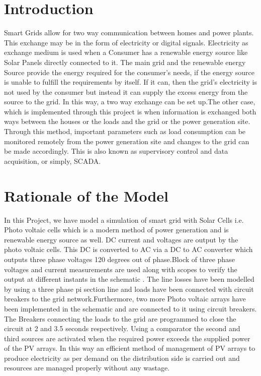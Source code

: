 \documentclass[12pt]{report}
\begin{document}
\section*{Introduction}

Smart Grids allow for two way communication between homes and power plants. This exchange may be in the form of electricity or digital signals. Electricity as exchange medium is used when a Consumer has a renewable energy source like Solar Panels directly connected to it. The main grid and the renewable energy Source provide the energy required for the consumer's needs, if the energy source is unable to fulfill the requirements by itself. If it can, then the grid's electricity is not used by the consumer but instead it can supply the excess energy from the source to the grid. In this way, a two way exchange can be set up.The other case, which is implemented through this project is when information is exchanged both ways between the houses or the loads and the grid or the power generation site. Through this method, important parameters such as load consumption can be monitored remotely from the power generation site and changes to the grid can be made accordingly. This is also known as supervisory control and data acquisition, or simply, SCADA. 

\section*{Rationale of the Model}
In this Project, we have model a simulation of smart grid with Solar Cells i.e. Photo voltaic cells which is a modern method of power generation and is renewable energy source as well. DC current and voltages are output by the photo voltaic cells. This DC is converted to AC via a DC to AC converter which outputs three phase voltages 120 degrees out of phase.Block of three phase voltages and current measurements are used along with scopes to verify the output at different instants in the schematic . The line losses have been modelled by using a three phase pi section line and loads have been connected with circuit breakers to the grid network.Furthermore, two more Photo voltaic arrays have been implemented in the schematic and are connected to it using circuit breakers. The Breakers connecting the loads to the grid are programmed to close the circuit at 2 and 3.5 seconds respectively. Using a comparator the second and third sources are activated when the required power exceeds the supplied power of the PV arrays. In this way an efficient method of management of PV arrays to produce electricity as per demand on the distribution side is carried out and resources are managed properly without any wastage.
\end{document}
